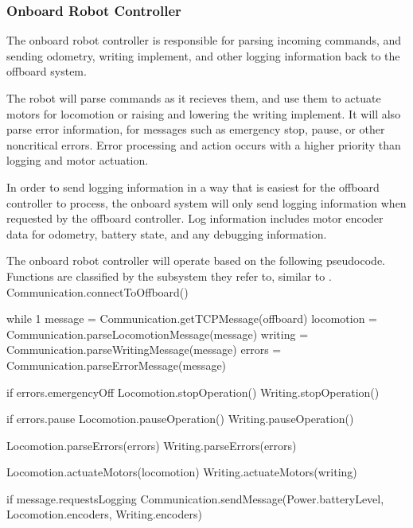 \subsubsection{Onboard Robot Controller}
\label{sec:software_full_onboard}
The onboard robot controller is responsible for parsing incoming commands, and sending odometry, writing implement, and other logging information back to the offboard system.

The robot will parse commands as it recieves them, and use them to actuate motors for locomotion or raising and lowering the writing implement. It will also parse error information, for messages such as emergency stop, pause, or other noncritical errors. Error processing and action occurs with a higher priority than logging and motor actuation.

In order to send logging information in a way that is easiest for the offboard controller to process, the onboard system will only send logging information when requested by the offboard controller. Log information includes motor encoder data for odometry, battery state, and any debugging information.

The onboard robot controller will operate based on the following pseudocode. Functions are classified by the subsystem they refer to, similar to .
Communication.connectToOffboard()

while 1
  message = Communication.getTCPMessage(offboard)
  locomotion = Communication.parseLocomotionMessage(message)
  writing = Communication.parseWritingMessage(message)
  errors = Communication.parseErrorMessage(message)

  if errors.emergencyOff
    Locomotion.stopOperation()
    Writing.stopOperation()

  if errors.pause
    Locomotion.pauseOperation()
    Writing.pauseOperation()

  Locomotion.parseErrors(errors)
  Writing.parseErrors(errors)

  Locomotion.actuateMotors(locomotion)
  Writing.actuateMotors(writing)

  if message.requestsLogging
    Communication.sendMessage(Power.batteryLevel, Locomotion.encoders, Writing.encoders)




